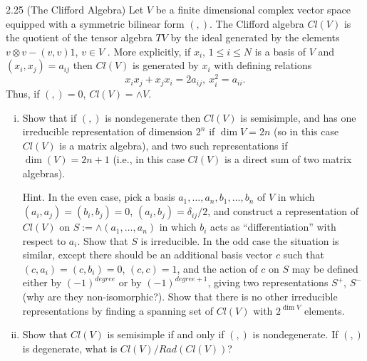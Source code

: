 \documentclass[twoside]{article}
\begin{document}
\begin{ejercicio}{2.25 (The Clifford Algebra)}
Let $V$ be a finite dimensional complex vector space
equipped with a symmetric bilinear form $(, )$. The Clifford algebra $Cl(V )$ is the quotient of the
tensor algebra $TV$ by the ideal generated by the elements $v ⊗ v −(v, v)1$, $v ∈ V$ . More explicitly, if
$x_i$, $1 ≤ i ≤ N$ is a basis of $V$ and $(x_i, x_j) = a_{ij}$ then $Cl(V )$ is generated by $x_i$ with defining relations
$$x_ix_j + x_jx_i = 2a_{ij} ,\ x^2_i = a_{ii}.$$
Thus, if $(, ) = 0$, $Cl(V ) = ∧V $.

\begin{enumerate}[(i)]
\item Show that if $(, )$ is nondegenerate then $Cl(V )$ is semisimple, and has one irreducible representation
of dimension $2^n$ if $\dim V = 2n$ (so in this case $Cl(V )$ is a matrix algebra), and two such
representations if $\dim(V ) = 2n+1$ (i.e., in this case $Cl(V )$ is a direct sum of two matrix algebras).

Hint. In the even case, pick a basis $a_1, \dots, a_n, b_1,\dots , b_n$ of $V$ in which $(a_i, a_j) = (b_i, b_j) = 0$,
$(a_i, b_j) = δ_{ij}/2$, and construct a representation of $Cl(V )$ on $S := ∧(a_1, \dots, a_n)$ in which $b_i$ acts as
“differentiation” with respect to $a_i$. Show that $S$ is irreducible. In the odd case the situation is
similar, except there should be an additional basis vector $c$ such that $(c, a_i) = (c, b_i) = 0$, $(c, c) =
1$, and the action of $c$ on $S$ may be defined either by $(−1)^{degree}$ or by $(−1)^{degree+1}$, giving two
representations $S^+$, $S^−$ (why are they non-isomorphic?). Show that there is no other irreducible
representations by finding a spanning set of $Cl(V )$ with $2^{\dim V}$ elements.

\item Show that $Cl(V )$ is semisimple if and only if $(, )$ is nondegenerate. If $(, )$ is degenerate, what
is $Cl(V )/Rad(Cl(V ))$?
\end{enumerate}
\end{ejercicio}
\begin{solucion}
\end{solucion}\
\end{document}
